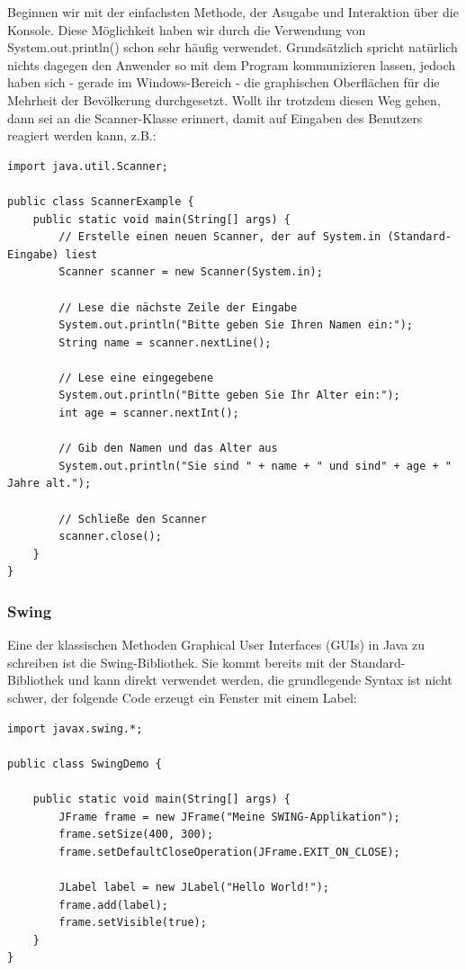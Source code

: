 \documentclass{article}
\begin{document}
Beginnen wir mit der einfachsten Methode, der Asugabe und Interaktion über die Konsole. Diese Möglichkeit haben wir durch die Verwendung von System.out.println() schon sehr häufig verwendet. Grundsätzlich spricht natürlich nichts dagegen den Anwender so mit dem Program kommunizieren lassen, jedoch haben sich - gerade im Windows-Bereich - die graphischen Oberflächen für die Mehrheit der Bevölkerung durchgesetzt. Wollt ihr trotzdem diesen Weg gehen, dann sei an die Scanner-Klasse erinnert, damit auf Eingaben des Benutzers reagiert werden kann, z.B.:
\begin{verbatim}
import java.util.Scanner;

public class ScannerExample {
    public static void main(String[] args) {
        // Erstelle einen neuen Scanner, der auf System.in (Standard-Eingabe) liest
        Scanner scanner = new Scanner(System.in);

        // Lese die nächste Zeile der Eingabe
        System.out.println("Bitte geben Sie Ihren Namen ein:");
        String name = scanner.nextLine();

        // Lese eine eingegebene 
        System.out.println("Bitte geben Sie Ihr Alter ein:");
        int age = scanner.nextInt();

        // Gib den Namen und das Alter aus
        System.out.println("Sie sind " + name + " und sind" + age + " Jahre alt.");

        // Schließe den Scanner
        scanner.close();
    }
}

\end{verbatim}


\subsubsection{Swing}
Eine der klassischen Methoden Graphical User Interfaces (GUIs) in Java zu schreiben ist die Swing-Bibliothek. Sie kommt bereits mit der Standard-Bibliothek und kann direkt verwendet werden, die grundlegende Syntax ist nicht schwer, der folgende Code erzeugt ein Fenster mit einem Label:
\newpage

\begin{verbatim}
import javax.swing.*;

public class SwingDemo {

    public static void main(String[] args) {
        JFrame frame = new JFrame("Meine SWING-Applikation");
        frame.setSize(400, 300);
        frame.setDefaultCloseOperation(JFrame.EXIT_ON_CLOSE);

        JLabel label = new JLabel("Hello World!");
        frame.add(label);
        frame.setVisible(true);
    }
}
\end{verbatim}
\end{document}
